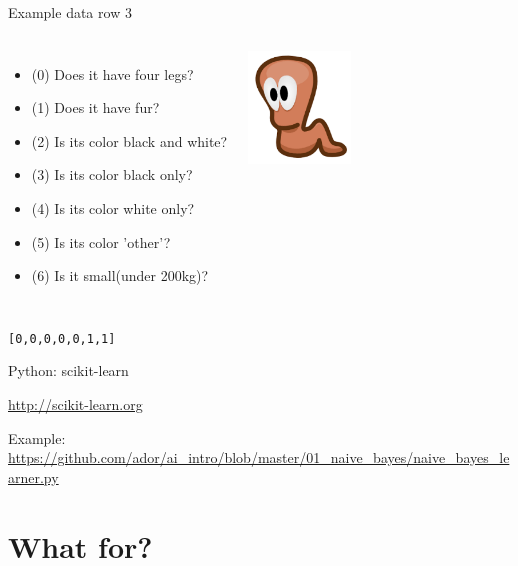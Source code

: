 \documentclass[15pt]{beamer}
\begin{document}
\begin{frame}{Example data row 3}
    \begin{columns}[b]
        \small
        \begin{itemize}\itemsep0.25em
            \item (0) Does it have four legs?
            \item (1) Does it have fur?
            \item (2) Is its color black and white?
            \item (3) Is its color black only?
            \item (4) Is its color white only?
            \item (5) Is its color 'other'?
            \item (6) Is it small(under 200kg)?
        \end{itemize}
        \includegraphics[height=30mm]{img/worm_1.png}
    \end{columns}

    \vspace{6mm}
    \normalsize
    \hspace{68mm}\texttt{[0,0,0,0,0,1,1]}
\end{frame}


\begin{frame}{Python: scikit-learn}
    \begin{center}
        \Large
        \url{http://scikit-learn.org}
    \end{center}

    \vspace{4mm}
    \normalsize
    Example:\\

    \vspace{2mm}
    \url{https://github.com/ador/ai_intro/blob/master/01_naive_bayes/naive_bayes_learner.py}
\end{frame}


\section{What for?}
\end{document}
